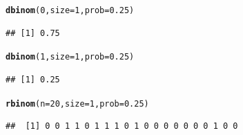 \documentclass[handout]{beamer}\usepackage[]{graphicx}\usepackage[]{color}
\makeatletter
\newcommand{\hlnum}[1]{\textcolor[rgb]{0.686,0.059,0.569}{#1}}%
\newcommand{\hlstd}[1]{\textcolor[rgb]{0.345,0.345,0.345}{#1}}%
\newcommand{\hlkwc}[1]{\textcolor[rgb]{0.333,0.667,0.333}{#1}}%
\newcommand{\hlkwd}[1]{\textcolor[rgb]{0.737,0.353,0.396}{\textbf{#1}}}%
\newenvironment{kframe}{%
 \def\at@end@of@kframe{}%
 \ifinner\ifhmode%
  \def\at@end@of@kframe{\end{minipage}}%
  \begin{minipage}{\columnwidth}%
 \fi\fi%
 \def\FrameCommand##1{\hskip\@totalleftmargin \hskip-\fboxsep
 \colorbox{shadecolor}{##1}\hskip-\fboxsep
     \hskip-\linewidth \hskip-\@totalleftmargin \hskip\columnwidth}%
 \MakeFramed {\advance\hsize-\width
   \@totalleftmargin\z@ \linewidth\hsize
   \@setminipage}}%
 {\par\unskip\endMakeFramed%
 \at@end@of@kframe}
\newenvironment{knitrout}{}{} %
\theoremstyle{plain}
\theoremstyle{definition}
\makeatother
\begin{document}
\begin{frame}[fragile]

\begin{knitrout}
\color{fgcolor}\begin{kframe}
\begin{alltt}
\hlkwd{dbinom}\hlstd{(}\hlnum{0}\hlstd{,}\hlkwc{size}\hlstd{=}\hlnum{1}\hlstd{,}\hlkwc{prob}\hlstd{=}\hlnum{0.25}\hlstd{)}
\end{alltt}
\begin{verbatim}
## [1] 0.75
\end{verbatim}
\begin{alltt}
\hlkwd{dbinom}\hlstd{(}\hlnum{1}\hlstd{,}\hlkwc{size}\hlstd{=}\hlnum{1}\hlstd{,}\hlkwc{prob}\hlstd{=}\hlnum{0.25}\hlstd{)}
\end{alltt}
\begin{verbatim}
## [1] 0.25
\end{verbatim}
\begin{alltt}
\hlkwd{rbinom}\hlstd{(}\hlkwc{n}\hlstd{=}\hlnum{20}\hlstd{,}\hlkwc{size} \hlstd{=} \hlnum{1}\hlstd{,}\hlkwc{prob}\hlstd{=}\hlnum{0.25}\hlstd{)}
\end{alltt}
\begin{verbatim}
##  [1] 0 0 1 1 0 1 1 1 0 1 0 0 0 0 0 0 0 1 0 0
\end{verbatim}
\end{kframe}
\end{knitrout}

\end{frame}


\end{document}
